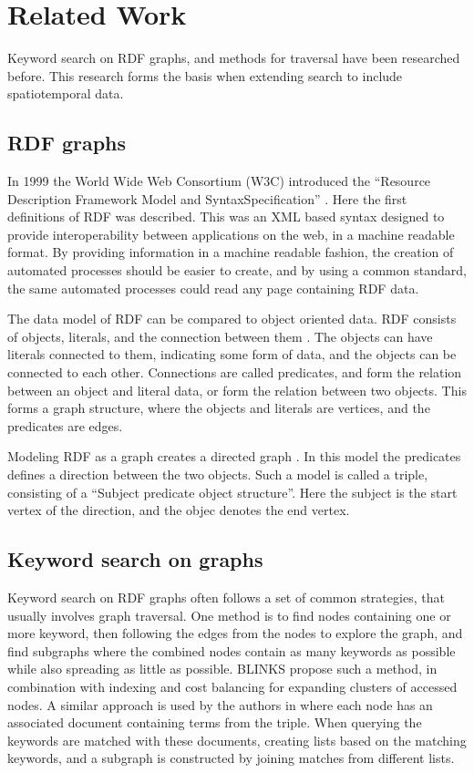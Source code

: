 \chapter{Related Work}
\label{cha:related_work}
Keyword search on RDF graphs, and methods for traversal have been researched before. This research forms the basis when extending search to include spatiotemporal data.

\section{RDF graphs}
In 1999 the World Wide Web Consortium (W3C) introduced the ``Resource Description Framework Model and SyntaxSpecification'' \cite{brickley1999resource}. Here the first definitions of RDF was described. This was an XML based syntax designed to provide interoperability between applications on the web, in a machine readable format. By providing information in a machine readable fashion, the creation of automated processes should be easier to create, and by using a common standard, the same automated processes could read any page containing RDF data.

The data model of RDF can be compared to object oriented data. RDF consists of objects, literals, and the connection between them \cite{decker2000framework}. The objects can have literals connected to them, indicating some form of data, and the objects can be connected to each other. Connections are called predicates, and form the relation between an object and literal data, or form the relation between two objects. This forms a graph structure, where the objects and literals are vertices, and the predicates are edges.

Modeling RDF as a graph creates a directed graph \cite{mcbride2002jena}. In this model the predicates defines a direction between the two objects. Such a model is called a triple, consisting of a ``Subject predicate object structure''\cite{decker2000framework}. Here the subject is the start vertex of the direction, and the objec denotes the end vertex.

\section{Keyword search on graphs}
Keyword search on RDF graphs often follows a set of common strategies, that usually involves graph traversal. One method is to find nodes containing one or more keyword, then following the edges from the nodes to explore the graph, and find subgraphs where the combined nodes contain as many keywords as possible while also spreading as little as possible. BLINKS \citep{blinks} propose such a method, in combination with indexing and cost balancing for expanding clusters of accessed nodes. A similar approach is used by the authors in \citep{Elbassuoni:2011:KSO:2063576.2063615} where each node has an associated document containing terms from the triple. When querying the keywords are matched with these documents, creating lists based on the matching keywords, and a subgraph is constructed by joining matches from different lists.

